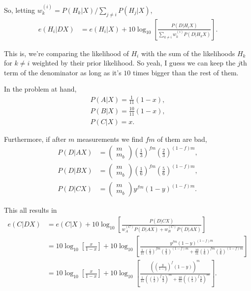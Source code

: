 \documentclass{article}
\begin{document}
So, letting $w_k^{(i)}=P(H_k|X)/\sum_{j\neq i}P(H_j|X)$,
\begin{align*}
	e(H_i|DX)&=e(H_i|X)+10\log_{10}\left[\frac{P(D|H_iX)}{\sum_{k\neq i}w_k^{(i)}P(D|H_kX)}\right].
\end{align*}

This is, we're comparing the likelihood of $H_i$ with the sum of the likelihoods $H_k$ for $k\neq i$ weighted by their prior likelihood. So yeah, I guess we can keep the $j$th term of the denominator as long as it's $10$ times bigger than the rest of them.

In the problem at hand,
\begin{align*}
	P(A|X)=\frac1{11}(1-x),\\
	P(B|X)=\frac{10}{11}(1-x),\\
	P(C|X)=x.
\end{align*}

Furthermore, if after $m$ measurements we find $fm$ of them are bad,
\begin{align*}
	P(D|AX)&=\begin{pmatrix}m\\m_b\end{pmatrix}\left(\frac13\right)^{fm}\left(\frac23\right)^{(1-f)m},\\
	P(D|BX)&=\begin{pmatrix}m\\m_b\end{pmatrix}\left(\frac16\right)^{fm}\left(\frac56\right)^{(1-f)m},\\
	P(D|CX)&=\begin{pmatrix}m\\m_b\end{pmatrix}y^{fm}(1-y)^{(1-f)m}.
\end{align*}

This all results in
\begin{align*}
	e(C|DX)&=e(C|X)+10\log_{10}\left[\frac{P(D|CX)}{w_A^{(C)}P(D|AX)+w_B^{(C)}P(D|AX)}\right]\\
	&=10\log_{10}\left[\frac{x}{1-x}\right]+10\log_{10}\left[\frac{y^{fm}(1-y)^{(1-f)m}}{\frac1{11}\left(\frac13\right)^{fm}\left(\frac23\right)^{(1-f)m}+\frac{10}{11}\left(\frac16\right)^{fm}\left(\frac56\right)^{(1-f)m}}\right]\\
	&=10\log_{10}\left[\frac{x}{1-x}\right]+10\log_{10}\left[\frac{\left(\left(\frac{y}{1-y}\right)^f(1-y)\right)^m}{\frac1{11}\left(\left(\frac12\right)^f\frac23\right)^m+\frac{10}{11}\left(\left(\frac15\right)^f\frac56\right)^m}\right].
\end{align*}
\end{document}
